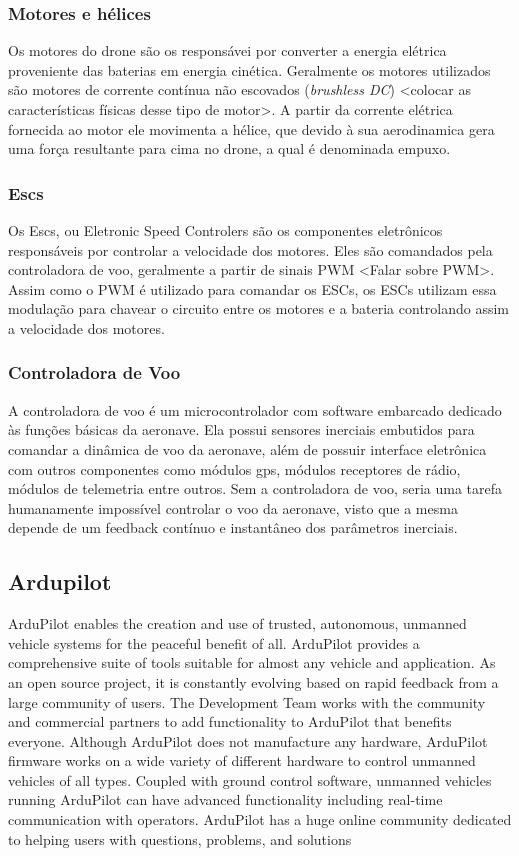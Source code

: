 \documentclass[12pt,a4paper,oneside]{book}
\begin{document}
\subsubsection*{Motores e hélices}

Os motores do drone são os responsávei por converter a energia elétrica proveniente das baterias em energia cinética. Geralmente os 
motores utilizados são motores de corrente contínua não escovados (\textit{brushless DC}) <colocar as características físicas desse tipo de motor>.
A partir da corrente elétrica fornecida ao motor ele movimenta a hélice, que devido à sua aerodinamica gera uma força resultante para cima no drone,
a qual é denominada empuxo. 

\subsubsection*{Escs}

Os Escs, ou Eletronic Speed Controlers são os componentes eletrônicos responsáveis por controlar a velocidade dos motores.
Eles são comandados pela controladora de voo, geralmente a partir de sinais PWM <Falar sobre PWM>. Assim como o PWM é utilizado para comandar 
os ESCs, os ESCs utilizam essa modulação para chavear o circuito entre os motores e a bateria controlando assim a velocidade dos motores. 

\subsubsection*{Controladora de Voo}

A controladora de voo é um microcontrolador com software embarcado dedicado às funções básicas da aeronave. Ela possui sensores 
inerciais embutidos para comandar a dinâmica de voo da aeronave, além de possuir interface eletrônica com outros componentes como módulos gps, módulos receptores de rádio, módulos de telemetria entre outros. Sem a controladora de voo, seria uma tarefa humanamente impossível controlar o voo da aeronave, visto que a mesma depende de um feedback contínuo e instantâneo dos parâmetros inerciais. 

\subsection{Ardupilot}

ArduPilot enables the creation and use of trusted, autonomous, unmanned vehicle systems for the peaceful benefit of all. ArduPilot provides a comprehensive suite of tools suitable for almost any vehicle and application. As an open source project, it is constantly evolving based on rapid feedback from a large community of users. The Development Team works with the community and commercial partners to add functionality to ArduPilot that benefits everyone. Although ArduPilot does not manufacture any hardware, ArduPilot firmware works on a wide variety of different hardware to control unmanned vehicles of all types. Coupled with ground control software, unmanned vehicles running ArduPilot can have advanced functionality including real-time communication with operators. ArduPilot has a huge online community dedicated to helping users with questions, problems, and solutions
\end{document}
